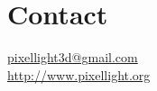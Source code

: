 \chapter{Contact}

\href{mailto:pixellight3d@gmail.com}{pixellight3d@gmail.com}\\
\url{http://www.pixellight.org}
